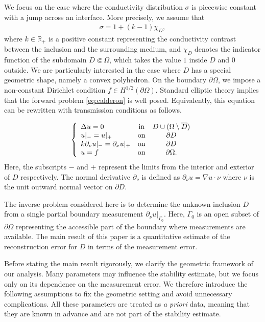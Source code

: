 ﻿\documentclass[11pt,reqno,oneside]{amsart}
\theoremstyle{definition}
\theoremstyle{remark}
\newcommand{\ba}{\begin{array}}
\newcommand{\ea}{\end{array}}
\newcommand{\R}{\mathbb{R}}
\newcommand{\n}{\nabla}
\newcommand{\p}{\partial}
\renewcommand{\O}{\Omega}
\begin{document}
 We focus on the case where the conductivity distribution $\sigma$ is piecewise constant with a jump across an interface. More precisely, we assume that 
 \begin{align*}
        \sigma=1+(k-1)\chi_D,
 \end{align*}
where $k\in \R_+$ is a positive constant representing the conductivity contrast between the inclusion and the surrounding medium, and $\chi_D$ denotes the indicator function of the subdomain $D\Subset \O$, which takes the value $1$ inside $D$ and $0$ outside. We are particularly interested in the case where $D$ has a special geometric shape, namely a convex polyhedron. On the boundary $\p\O$, we impose a non-constant Dirichlet condition $f\in H^{1/2}(\p\O)$. Standard elliptic theory implies that the forward problem \eqref{eq:calderon} is well posed. Equivalently, this equation can be rewritten with transmission conditions as follows.

 \begin{align}\label{eq:transmission}
    \left\lbrace \ba{lcc} \Delta u=0 & {\rm in} & D\cup (\O\setminus \overline{D}) \\ u|_-=u|_+ & {\rm on} & \p D \\ k\p_\nu u|_-=\p_\nu u|_+ & {\rm on} & \p D \\ u=f & {\rm on} & \p\O. \ea \right.
 \end{align}
 Here, the subscripts $-$ and $+$ represent the limits from the interior and exterior of $D$ respectively. The normal derivative $\p_\nu$ is defined as $\p_\nu u=\n u\cdot \nu$ where $\nu$ is the unit outward normal vector on $\p D$.
 
The inverse problem considered here is to determine the unknown inclusion $D$ from a single partial boundary measurement $\p_\nu u|_{\Gamma_0}$. Here, $\Gamma_0$ is an open subset of $\p\O$ representing the accessible part of the boundary where measurements are available. The main result of this paper is a quantitative estimate of the reconstruction error for $D$ in terms of the measurement error.

Before stating the main result rigorously, we clarify the geometric framework of our analysis. Many parameters may influence the stability estimate, but we focus only on its dependence on the measurement error. We therefore introduce the following assumptions to fix the geometric setting and avoid unnecessary complications. All these parameters are treated as {\it a priori} data, meaning that they are known in advance and are not part of the stability estimate.
\end{document}
